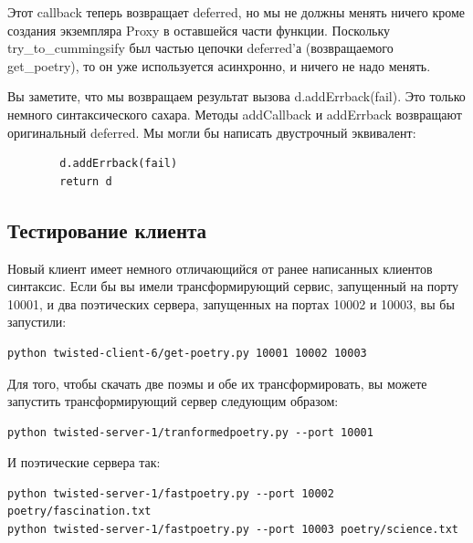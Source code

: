 Этот callback теперь возвращает deferred, но 
мы не должны менять 
ничего кроме создания экземпляра Proxy в
оставшейся части функции. 
Поскольку try\_to\_cummingsify был частью цепочки 
deferred'а (возвращаемого get\_poetry), 
то он уже используется асинхронно, и ничего не надо менять. 


Вы заметите, что мы возвращаем результат вызова d.addErrback(fail). 
Это только немного синтаксического сахара. Методы 
addCallback и addErrback возвращают оригинальный deferred. Мы могли 
бы написать двустрочный эквивалент:

\begin{scriptsize}\begin{verbatim}
        d.addErrback(fail)
        return d
\end{verbatim}\end{scriptsize}

\subsection{Тестирование клиента}


Новый клиент имеет немного отличающийся от ранее написанных 
клиентов синтаксис. Если бы вы имели трансформирующий 
сервис, запущенный на порту 10001, и два поэтических сервера, запущенных на 
портах 10002 и 10003, вы бы запустили:

\begin{scriptsize}\begin{verbatim}
python twisted-client-6/get-poetry.py 10001 10002 10003
\end{verbatim}\end{scriptsize}

Для того, чтобы скачать две поэмы и обе их трансформировать, 
вы можете запустить трансформирующий сервер следующим образом:

\begin{scriptsize}\begin{verbatim}
python twisted-server-1/tranformedpoetry.py --port 10001
\end{verbatim}\end{scriptsize}

И поэтические сервера так:

\begin{scriptsize}\begin{verbatim}
python twisted-server-1/fastpoetry.py --port 10002 poetry/fascination.txt
python twisted-server-1/fastpoetry.py --port 10003 poetry/science.txt
\end{verbatim}\end{scriptsize}


